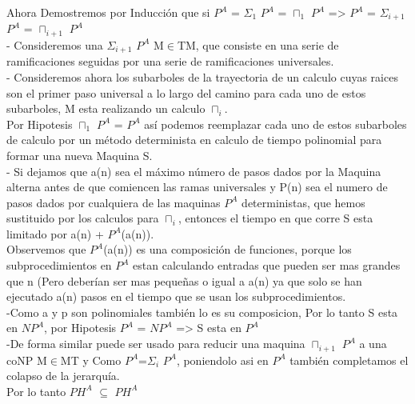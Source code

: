 \documentclass[12pt]{article}
\begin{document}
Ahora Demostremos por Inducción que si $P^A$ = $\Sigma_{1}$ $P^A$ = $\sqcap_{1}$ $P^A$ => $P^A$ = $\Sigma_{i+1}$ $P^A$ = $\sqcap_{i+1}$ $P^A$\\
- Consideremos una $\Sigma_{i+1}$ $P^A$   M$\in$TM, que consiste en una serie de ramificaciones seguidas por una serie de ramificaciones universales.\\
- Consideremos ahora los subarboles de la trayectoria de un calculo cuyas raices son el primer paso universal a lo largo del camino para cada uno
de estos subarboles, M esta realizando un calculo $\sqcap_{i}$.\\
Por Hipotesis $\sqcap_{1}$ $P^A$ = $P^A$ así podemos reemplazar cada uno de estos subarboles de calculo por un método determinista en calculo de tiempo polinomial para formar una nueva Maquina S.\\
- Si dejamos que a(n) sea el máximo número de pasos dados por la Maquina alterna antes de que comiencen las ramas universales y P(n) sea el numero de pasos dados por cualquiera de las maquinas $P^A$ deterministas, que hemos sustituido por los calculos para $\sqcap_{i}$, entonces el tiempo en que corre S esta limitado por a(n) + $P^A$(a(n)).\\
Observemos que $P^A$(a(n)) es una composición de funciones, porque los subprocedimientos en $P^A$ estan calculando entradas que pueden ser mas grandes que n (Pero deberían ser mas pequeñas o igual a a(n) ya que solo se han ejecutado a(n) pasos en el tiempo que se usan los subprocedimientos.\\
-Como a y p son polinomiales también lo es su composicion, Por lo tanto S esta en $NP^A$, por Hipotesis $P^A$ = $NP^A$ => S esta en $P^A$\\
-De forma similar puede ser usado para reducir una maquina $\sqcap_{i+1}$ $P^A$ a una coNP M$\in$MT y Como $P^A$=$\Sigma_{i}$ $P^A$, poniendolo asi en $P^A$ también completamos el colapso de la jerarquía.\\
Por lo tanto $PH^A$ $\subseteq$ $PH^A$ 
\end{document}
